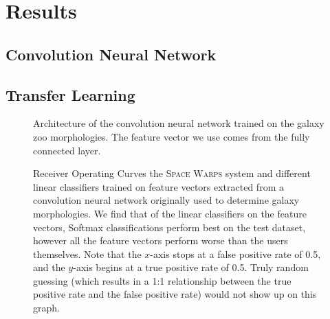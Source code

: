 \documentclass[10pt,twocolumn,letterpaper]{article}
\begin{document}
\section{Results}


\subsection{Convolution Neural Network}


\subsection{Transfer Learning}

\begin{figure}%
\centering
{}
\caption{Architecture of the convolution
  neural network trained on the galaxy zoo morphologies. The feature vector we
use comes from the fully connected layer.}
\label{fig:ryan_architecture}
\end{figure}

\begin{figure*}%
\begin{minipage}[b]{0.48\linewidth}
\centering{}
\end{minipage} \hfill
\begin{minipage}[b]{0.48\linewidth}
\centering{}
\end{minipage} \hfill
  \caption{Receiver Operating Curves the \textsc{Space Warps} system and
    different linear classifiers trained on feature vectors extracted from a
    convolution neural network originally used to determine galaxy
  morphologies. We find that of the linear classifiers on the feature vectors,
Softmax classifications perform best on the test dataset,
however all the feature vectors perform worse than the users themselves. Note
that the $x$-axis stops at a false positive rate of 0.5, and the $y$-axis
begins at a true positive rate of 0.5. Truly random guessing (which results in
a 1:1 relationship between the true positive rate and the false positive rate)
would not show up on this graph.}
\label{fig:roc_tl} 
\end{figure*}
\end{document}
